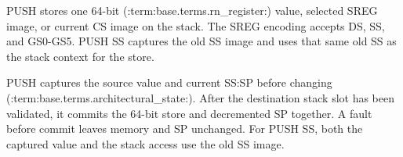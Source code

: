 PUSH stores one 64-bit (:term:base.terms.rn_register:) value, selected SREG image, or current CS image on the stack. The SREG encoding accepts DS, SS, and GS0-GS5. PUSH SS captures the old SS image and uses that same old SS as the stack context for the store.

PUSH captures the source value and current SS:SP before changing (:term:base.terms.architectural_state:). After the destination stack slot has been validated, it commits the 64-bit store and decremented SP together. A fault before commit leaves memory and SP unchanged. For PUSH SS, both the captured value and the stack access use the old SS image.
